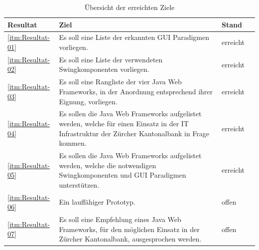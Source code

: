   \begin{table}[p]
    \sffamily 
    \begin{center}
      \begin{tabular}{lp{9cm}ll}
        \toprule
        \textbf{Resultat} & \textbf{Ziel} & \textbf{Stand} \\
        \midrule
        \ref{itm:Resultat-01} &
          Es soll eine Liste der erkannten GUI Paradigmen vorliegen. &
          erreicht\\
        \ref{itm:Resultat-02} &
          Es soll eine Liste der verwendeten Swingkomponenten vorliegen. &
          erreicht\\
        \ref{itm:Resultat-03} &
          Es soll eine Rangliste der vier Java Web Frameworks, in der Anordnung
          entsprechend ihrer Eignung, vorliegen. &
          erreicht\\
        \ref{itm:Resultat-04} &
          Es sollen die Java Web Frameworks aufgelistet werden, welche für
          einen Einsatz in der IT Infrastruktur der Zürcher Kantonalbank in
          Frage kommen. &
          erreicht\\
        \ref{itm:Resultat-05} &
          Es sollen die Java Web Frameworks aufgelistet werden, welche die
          notwendigen Swingkomponenten und GUI Paradigmen unterstützen. &
          erreicht\\
        \ref{itm:Resultat-06} &
          Ein lauffähiger Prototyp. &
          offen\\
        \ref{itm:Resultat-07} &
          Es soll eine Empfehlung eines Java Web Frameworks, für den möglichen
          Einsatz in der Zürcher Kantonalbank, ausgesprochen werden. &
          offen\\
        \bottomrule
      \end{tabular}
      \caption{Übersicht der erreichten Ziele}
      \label{tab:erreichteZiele}
    \end{center}
  \end{table}